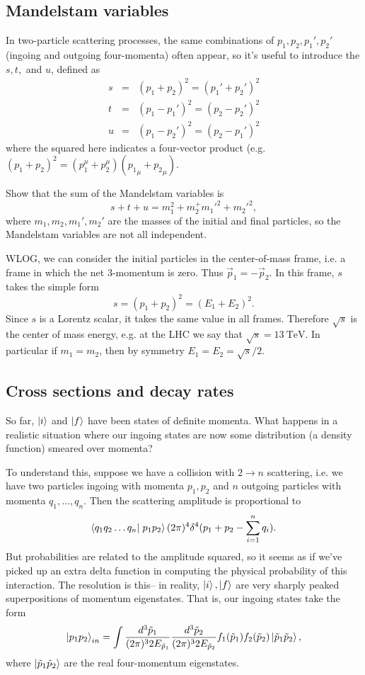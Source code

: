 \subsection*{Mandelstam variables} In two-particle scattering processes, the same combinations of $p_1,p_2,p_1',p_2'$ (ingoing and outgoing four-momenta) often appear, so it's useful to introduce the  $s,t,$ and $u$, defined as
\begin{eqnarray*}
s&=&(p_1+p_2)^2=(p_1'+p_2')^2\\
t&=&(p_1-p_1')^2=(p_2-p_2')^2\\
u&=&(p_1-p_2')^2=(p_2-p_1')^2
\end{eqnarray*}
where the squared here indicates a four-vector product (e.g. $(p_1+p_2)^2=(p_1^\mu+p_2^\mu)({p_1}_\mu+{p_2}_\mu).$
\begin{ex}
Show that the sum of the Mandelstam variables is
$$s+t+u=m_1^2+m_2^+{m_1'}^2+{m_2'}^2,$$
where $m_1,m_2,m_1',m_2'$ are the masses of the initial and final particles, so the Mandelstam variables are not all independent.
\end{ex}

WLOG, we can consider the initial particles in the center-of-mass frame, i.e. a frame in which the net $3$-momentum is zero. Thus $\vec{p}_1=-\vec{p}_2.$
In this frame, $s$ takes the simple form
$$s=(p_1+p_2)^2=(E_1+E_2)^2.$$ Since $s$ is a Lorentz scalar, it takes the same value in all frames. Therefore $\sqrt{s}$ is the center of mass energy, e.g. at the LHC we say that $\sqrt{s}=\SI{13}{\tera\electronvolt}$. In particular if $m_1=m_2$, then by symmetry $E_1=E_2=\sqrt{s}/2.$

\subsection*{Cross sections and decay rates} So far, $\left| i \right>$ and $\left| f \right>$ have been states of definite momenta. What happens in a realistic situation where our ingoing states are now some distribution (a density function) smeared over momenta?

To understand this, suppose we have a collision with $2\to n$ scattering, i.e. we have two particles ingoing with momenta $p_1,p_2$ and $n$ outgoing particles with momenta $q_1,\ldots,q_n$. Then the scattering amplitude is proportional to
$$\braket{q_1 q_2\ldots q_n}{p_1p_2}(2\pi)^4 \delta^4(p_1+p_2 -\sum_{i=1}^n q_i).$$
But probabilities are related to the amplitude squared, so it seems as if we've picked up an extra delta function in computing the physical probability of this interaction. The resolution is this-- in reality, $\left| i \right>,\left| f \right>$ are very sharply peaked superpositions of momentum eigenstates. That is, our ingoing states take the form
$$\left| p_1p_2 \right>_{in}=\int \frac{d^3 \tilde p_1}{(2\pi)^3 2E_{\tilde p_1}}\frac{d^3 \tilde p_2}{(2\pi)^3 2E_{\tilde p_2}} f_1(\tilde p_1)f_2 (\tilde p_2)\left| \tilde p_1 \tilde p_2 \right>,$$
where $\left| \tilde p_1 \tilde p_2 \right>$ are the real four-momentum eigenstates.

